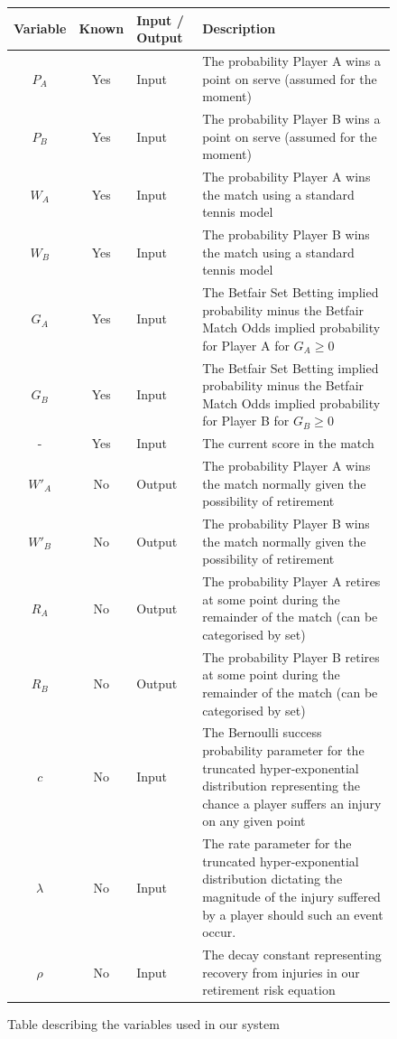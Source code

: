 \documentclass[authoryear, 12pt]{elsarticle}
\begin{document}
\begin{figure}[H]
\begin{center}
\renewcommand{\arraystretch}{1.1}
\begin{tabular}{|c|c|C{1.5cm}|C{7.3cm}|}
	\hline
	\textbf{Variable} & \textbf{Known} & \textbf{Input / Output} & \textbf{Description} \\ \hline
	$P_A$ & Yes & Input & The probability Player A wins a point on serve (assumed for the moment) \\ \hline
	$P_B$ & Yes & Input & The probability Player B wins a point on serve (assumed for the moment) \\ \hline
	$W_A$ & Yes & Input & The probability Player A wins the match using a standard tennis model \\ \hline
	$W_B$ & Yes & Input & The probability Player B wins the match using a standard tennis model	 \\ \hline
	$G_A$ & Yes & Input & The Betfair Set Betting implied probability minus the Betfair Match Odds implied probability for Player A for $G_A \geq 0$ \\ \hline
	$G_B$ & Yes & Input & The Betfair Set Betting implied probability minus the Betfair Match Odds implied probability for Player B for $G_B \geq 0$	 \\ \hline
	- & Yes & Input & The current score in the match \\ \hline \hline
	$W'_A$ & No & Output & The probability Player A wins the match normally given the possibility of retirement \\ \hline
	$W'_B$ & No & Output & The probability Player B wins the match normally given the possibility of retirement \\ \hline
	$R_A$ & No & Output & The probability Player A retires at some point during the remainder of the match (can be categorised by set) \\ \hline
	$R_B$ & No & Output & The probability Player B retires at some point during the remainder of the match (can be categorised by set) \\ \hline \hline
	$c$ & No & Input & The Bernoulli success probability parameter for the truncated hyper-exponential distribution representing the chance a player suffers an injury on any given point	\\ \hline
	$\lambda$ & No & Input & The rate parameter for the truncated hyper-exponential distribution dictating the magnitude of the injury suffered by a player should such an event occur. \\ \hline
	$\rho$ & No & Input & The decay constant representing recovery from injuries in our retirement risk equation	 \\ \hline
\end{tabular}
\renewcommand{\arraystretch}{1}
\end{center}
\caption{Table describing the variables used in our system}
\label{variabletable}
\end{figure}
\end{document}
